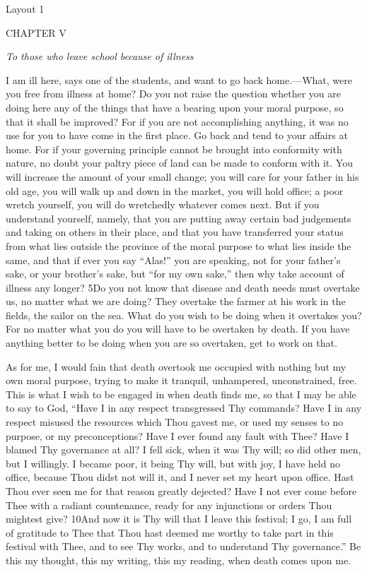 
Layout 1

CHAPTER V

\emph{To those who leave school because of illness}

I am ill here, says one of the students, and want to go back home.—What, were you free from illness at home? Do you not raise the question whether you are doing here any of the things that have a bearing upon your moral purpose, so that it shall be improved? For if you are not accomplishing anything, it was no use for you to have come in the first place. Go back and tend to your affairs at home. For if your governing principle cannot be brought into conformity with nature, no doubt your paltry piece of land can be made to conform with it. You will increase the amount of your small change; you will care for your father in his old age, you will walk up and down in the market, you will hold office; a poor wretch yourself, you will do wretchedly whatever comes next. But if you understand yourself, namely, that you are putting away certain bad judgements and taking on others in their place, and that you have transferred your status from what lies outside the province of the moral purpose to what lies inside the same, and that if ever you say ``Alas!'' you are speaking, not for your father's sake, or your brother's sake, but ``for my own sake,'' then why take account of illness any longer? 5Do you not know that disease and death needs must overtake us, no matter what we are doing? They overtake the farmer at his work in the fields, the sailor on the sea. What do you wish to be doing when it overtakes you? For no matter what you do you will have to be overtaken by death. If you have anything better to be doing when you are so overtaken, get to work on that.

As for me, I would fain that death overtook me occupied with nothing but my own moral purpose, trying to make it tranquil, unhampered, unconstrained, free. This is what I wish to be engaged in when death finds me, so that I may be able to say to God, ``Have I in any respect transgressed Thy commands? Have I in any respect misused the resources which Thou gavest me, or used my senses to no purpose, or my preconceptions? Have I ever found any fault with Thee? Have I blamed Thy governance at all? I fell sick, when it was Thy will; so did other men, but I willingly. I became poor, it being Thy will, but with joy, I have held no office, because Thou didst not will it, and I never set my heart upon office. Hast Thou ever seen me for that reason greatly dejected? Have I not ever come before Thee with a radiant countenance, ready for any injunctions or orders Thou mightest give? 10And now it is Thy will that I leave this festival; I go, I am full of gratitude to Thee that Thou hast deemed me worthy to take part in this festival with Thee, and to see Thy works, and to understand Thy governance.'' Be this my thought, this my writing, this my reading, when death comes upon me.

